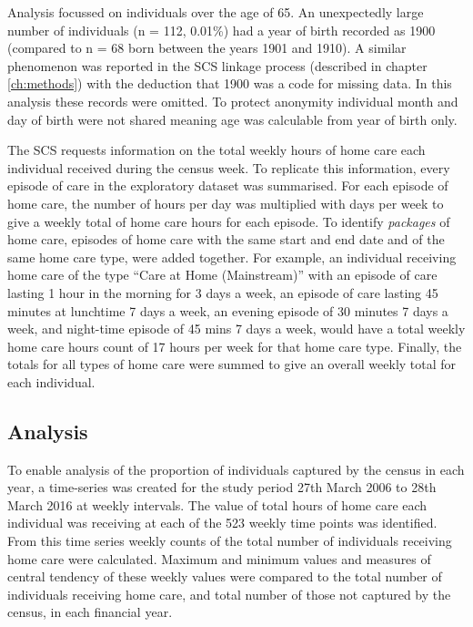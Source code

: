 \documentclass[]{article}
\begin{document}
Analysis focussed on individuals over the age of 65. An unexpectedly
large number of individuals (n = 112, 0.01\%) had a year of birth
recorded as 1900 (compared to n = 68 born between the years 1901 and
1910). A similar phenomenon was reported in the SCS linkage process
(described in chapter \ref{ch:methods}) with the deduction that 1900 was
a code for missing data. In this analysis these records were omitted. To
protect anonymity individual month and day of birth were not shared
meaning age was calculable from year of birth only.

The SCS requests information on the total weekly hours of home care each
individual received during the census week. To replicate this
information, every episode of care in the exploratory dataset was
summarised. For each episode of home care, the number of hours per day
was multiplied with days per week to give a weekly total of home care
hours for each episode. To identify \emph{packages} of home care,
episodes of home care with the same start and end date and of the same
home care type, were added together. For example, an individual
receiving home care of the type ``Care at Home (Mainstream)'' with an
episode of care lasting 1 hour in the morning for 3 days a week, an
episode of care lasting 45 minutes at lunchtime 7 days a week, an
evening episode of 30 minutes 7 days a week, and night-time episode of
45 mins 7 days a week, would have a total weekly home care hours count
of 17 hours per week for that home care type. Finally, the totals for
all types of home care were summed to give an overall weekly total for
each individual.

\subsection{Analysis}\label{subsec:renf-methods-analysis}

To enable analysis of the proportion of individuals captured by the
census in each year, a time-series was created for the study period 27th
March 2006 to 28th March 2016 at weekly intervals. The value of total
hours of home care each individual was receiving at each of the 523
weekly time points was identified. From this time series weekly counts
of the total number of individuals receiving home care were calculated.
Maximum and minimum values and measures of central tendency of these
weekly values were compared to the total number of individuals receiving
home care, and total number of those not captured by the census, in each
financial year.
\end{document}
